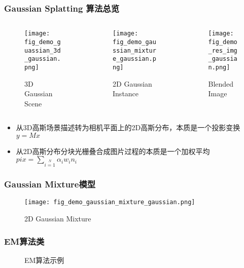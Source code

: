 \begin{frame}
    \frametitle{Gaussian Splatting 算法总览}
    \begin{columns}[c]
        \begin{column}{0.3\textwidth}
            \begin{figure}
                \texttt{[image: fig\_demo\_guassian\_3d\_gaussian.png]}
                \caption{3D Gaussian Scene}
            \end{figure}
        \end{column}
        \begin{column}{0.3\textwidth}
            \begin{figure}
                \texttt{[image: fig\_demo\_gaussian\_mixture\_gaussian.png]}
                \caption{2D Gaussian Instance}
            \end{figure}
        \end{column}
        \begin{column}{0.3\textwidth}
            \begin{figure}
                \texttt{[image: fig\_demo\_res\_img\_gaussian.png]}
                \caption{Blended Image}
            \end{figure}
        \end{column}
    \end{columns}
    \begin{itemize}
        \item 从3D高斯场景描述转为相机平面上的2D高斯分布，本质是一个投影变换$y=Mx$
        \item 从2D高斯分布分块光栅叠合成图片过程的本质是一个加权平均$pix=\sum\limits_{i=1}\limits^{N} \alpha_i w_in_i$
    \end{itemize}   
\end{frame}

\begin{frame}
    \frametitle{Gaussian Mixture模型}
    \begin{figure}[H]
        \texttt{[image: fig\_demo\_gaussian\_mixture\_gaussian.png]}
        \caption{2D Gaussian Mixture}
    \end{figure}
\end{frame}

\begin{frame}
    \frametitle{EM算法类}
    \begin{figure}[H]
        
        \caption{EM算法示例}
    \end{figure}
\end{frame}

